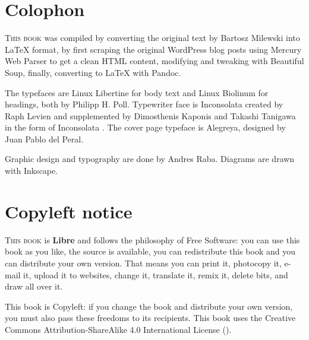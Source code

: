 
\printindex

\chapter*{Colophon}
\lettrine[lraise=-0.03,loversize=0.08]{T}{his book} was compiled by converting the original text by Bartosz Milewski into \LaTeX{} format, by
first scraping the original WordPress blog posts using Mercury Web Parser
to get a clean HTML content, modifying and tweaking with Beautiful Soup, finally, converting to LaTeX with Pandoc.

The typefaces are Linux Libertine for body text and Linux Biolinum for headings, both by Philipp H. Poll. Typewriter face is Inconsolata
created by Raph Levien and supplemented by Dimosthenis Kaponis and Takashi Tanigawa in the form of Inconsolata . The cover page
typeface is Alegreya, designed by Juan Pablo del Peral.

Graphic design and typography are done by Andres Raba. Diagrams are drawn with Inkscape.

\chapter*{Copyleft notice}
\lettrine[lraise=-0.03,loversize=0.08]{T}{his book} is \textbf{Libre} and follows the philosophy of Free Software: 
you can use this book as you like, the source is available, you can redistribute
this book and you can distribute your own version. That means you can print it,
photocopy it, e-mail it, upload it to websites, change it, translate it, remix it, delete bits,
and draw all over it.

This book is Copyleft: if you change the book and distribute your own version, you must also pass these freedoms to its recipients.
This book uses the Creative Commons Attribution-ShareAlike 4.0 International License 
(\href{http://creativecommons.org/licenses/by-sa/4.0/}{}).

